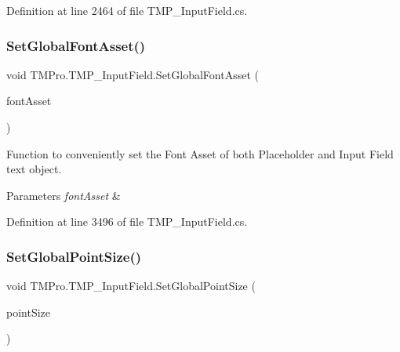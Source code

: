Definition at line 2464 of file T\+M\+P\+\_\+\+Input\+Field.\+cs.

\mbox{\label{class_t_m_pro_1_1_t_m_p___input_field_a2ed20e5b12507b1ff2e108dd99d4091f}} 
\subsubsection{\texorpdfstring{SetGlobalFontAsset()}{SetGlobalFontAsset()}}
{\footnotesize\ttfamily void T\+M\+Pro.\+T\+M\+P\+\_\+\+Input\+Field.\+Set\+Global\+Font\+Asset (\begin{DoxyParamCaption}\item[{\mbox{\hyperlink{class_t_m_pro_1_1_t_m_p___font_asset}{T\+M\+P\+\_\+\+Font\+Asset}}}]{font\+Asset }\end{DoxyParamCaption})}



Function to conveniently set the Font Asset of both Placeholder and Input Field text object. 


\begin{DoxyParams}{Parameters}
{\em font\+Asset} & \\
\hline
\end{DoxyParams}


Definition at line 3496 of file T\+M\+P\+\_\+\+Input\+Field.\+cs.

\mbox{\label{class_t_m_pro_1_1_t_m_p___input_field_aba2ab9700cbd18d64736530a34d91068}} 
\subsubsection{\texorpdfstring{SetGlobalPointSize()}{SetGlobalPointSize()}}
{\footnotesize\ttfamily void T\+M\+Pro.\+T\+M\+P\+\_\+\+Input\+Field.\+Set\+Global\+Point\+Size (\begin{DoxyParamCaption}\item[{float}]{point\+Size }\end{DoxyParamCaption})}



